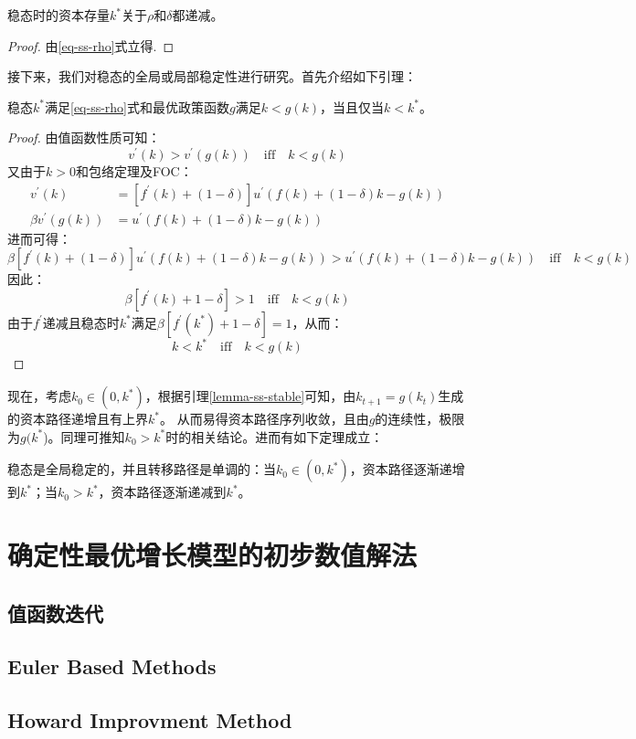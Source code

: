 \begin{property}
    稳态时的资本存量$k^*$关于$\rho$和$\delta$都递减。
\end{property}
\begin{proof}
    由\ref{eq-ss-rho}式立得.
\end{proof}

接下来，我们对稳态的全局或局部稳定性进行研究。首先介绍如下引理：
\begin{lemma}   \label{lemma-ss-stable}
    稳态$k^*$满足\ref{eq-ss-rho}式和最优政策函数$g$满足$k<g(k)$，当且仅当$k<k^*$。
\end{lemma}
\begin{proof}
    由值函数性质可知：
    $$v^{\prime}(k)>v^{\prime}\left(g\left(k\right)\right) \quad \text{iff} \quad k < g(k)$$
    又由于$k>0$和包络定理及FOC：
    $$
    \begin{aligned}
        v^{\prime}(k) & =\left[f^{\prime}(k)+(1-\delta)\right] u^{\prime}(f(k)+(1-\delta) k-g(k)) \\
            \beta v^{\prime}(g(k)) & =u^{\prime}(f(k)+(1-\delta) k-g(k))
    \end{aligned}
    $$
    进而可得：
    $$
    \beta\left[f^{\prime}(k)+(1-\delta)\right] u^{\prime}(f(k)+(1-\delta) k-g(k)) 
        >u^{\prime}(f(k)+(1-\delta) k-g(k)) \quad \text{iff} \quad k<g(k)
    $$
    因此：
    $$\beta\left[f^{\prime}\left(k\right)+1-\delta\right]>1 \quad \text{iff} \quad k<g(k)$$
    由于$f^{\prime}$递减且稳态时$k^*$满足$\beta\left[f^{\prime}\left(k^*\right)+1-\delta\right]=1$，从而：
    $$k < k^* \quad \text{iff} \quad k<g(k)$$
\end{proof}
现在，考虑$k_0\in (0, k^*)$，根据引理\ref{lemma-ss-stable}可知，由$k_{t+1}=g(k_t)$生成的资本路径递增且有上界$k^*$。
从而易得资本路径序列收敛，且由$g$的连续性，极限为$g(k^*$)。同理可推知$k_0>k^*$时的相关结论。进而有如下定理成立：
\begin{theorem}[稳态的稳定性]
    稳态是全局稳定的，并且转移路径是单调的：当$k_0\in (0, k^*)$，资本路径逐渐递增到$k^*$；当$k_0>k^*$，资本路径逐渐递减到$k^*$。
\end{theorem}


\section{确定性最优增长模型的初步数值解法}

%
\subsection{值函数迭代}

%
\subsection{Euler Based Methods}

%
\subsection{Howard Improvment Method}

